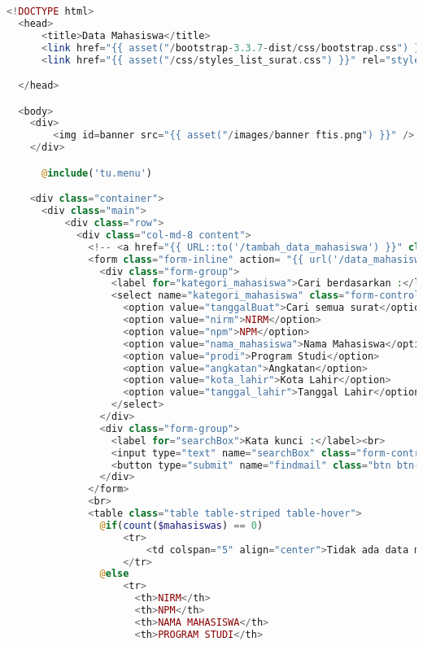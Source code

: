 \begin{lstlisting}[language=php,basicstyle=\tiny,caption=Data mahasiswa]
	<!DOCTYPE html>
  <head>
      <title>Data Mahasiswa</title>
      <link href="{{ asset("/bootstrap-3.3.7-dist/css/bootstrap.css") }}" rel="stylesheet" type="text/css" />
      <link href="{{ asset("/css/styles_list_surat.css") }}" rel="stylesheet" type="text/css">

  </head>

  <body>
    <div>
        <img id=banner src="{{ asset("/images/banner ftis.png") }}" />
    </div>

      @include('tu.menu')

    <div class="container">
      <div class="main">
          <div class="row">
            <div class="col-md-8 content">
              <!-- <a href="{{ URL::to('/tambah_data_mahasiswa') }}" class="btn btn-default">Tambah Data Mahasiswa</a> -->
              <form class="form-inline" action= "{{ url('/data_mahasiswa') }}" method="get">
                <div class="form-group">
                  <label for="kategori_mahasiswa">Cari berdasarkan :</label><br>
                  <select name="kategori_mahasiswa" class="form-control">
                    <option value="tanggalBuat">Cari semua surat</option>
                    <option value="nirm">NIRM</option>
                    <option value="npm">NPM</option>
                    <option value="nama_mahasiswa">Nama Mahasiswa</option>
                    <option value="prodi">Program Studi</option>
                    <option value="angkatan">Angkatan</option>
                    <option value="kota_lahir">Kota Lahir</option>
                    <option value="tanggal_lahir">Tanggal Lahir</option>
                  </select>
                </div>
                <div class="form-group">
                  <label for="searchBox">Kata kunci :</label><br>
                  <input type="text" name="searchBox" class="form-control" size = "65">
                  <button type="submit" name="findmail" class="btn btn-primary">Cari mahasiswa</button>
                </div>
              </form>
              <br>
              <table class="table table-striped table-hover">
                @if(count($mahasiswas) == 0)
                    <tr>
                        <td colspan="5" align="center">Tidak ada data mahasiswa ...</td>
                    </tr>
                @else
                    <tr>
                      <th>NIRM</th>
                      <th>NPM</th>
                      <th>NAMA MAHASISWA</th>
                      <th>PROGRAM STUDI</th>

\end{lstlisting}
